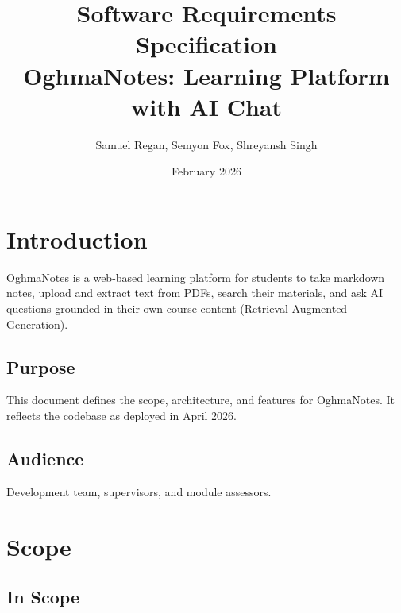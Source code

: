 \documentclass[12pt,a4paper]{article}
\title{Software Requirements Specification \\
\Large OghmaNotes: Learning Platform with AI Chat}
\author{Samuel Regan, Semyon Fox, Shreyansh Singh}
\date{February 2026}
\begin{document}
\maketitle

\begin{center}
\end{center}

\tableofcontents
\newpage

\section{Introduction}

OghmaNotes is a web-based learning platform for students to take markdown notes, upload and extract text from PDFs, search their materials, and ask AI questions grounded in their own course content (Retrieval-Augmented Generation).

\subsection{Purpose}

This document defines the scope, architecture, and features for OghmaNotes. It reflects the codebase as deployed in April 2026.

\subsection{Audience}

Development team, supervisors, and module assessors.

\section{Scope}

\subsection{In Scope}
\end{document}
